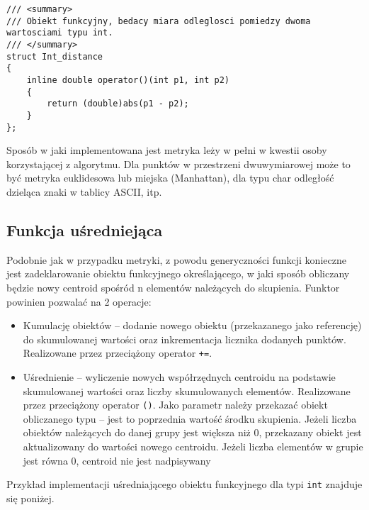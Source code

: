\begin{lstlisting}
/// <summary>
/// Obiekt funkcyjny, bedacy miara odleglosci pomiedzy dwoma wartosciami typu int.
/// </summary>
struct Int_distance
{
	inline double operator()(int p1, int p2)
	{
		return (double)abs(p1 - p2);
	}
};
\end{lstlisting}

Sposób w jaki implementowana jest metryka leży w pełni w kwestii osoby korzystającej z algorytmu. Dla punktów w przestrzeni dwuwymiarowej może to być metryka euklidesowa lub miejska (Manhattan), dla typu char odległość dzieląca znaki w tablicy ASCII, itp.

\subsection{Funkcja uśredniejąca}\label{avg}

Podobnie jak w przypadku metryki, z powodu generyczności funkcji konieczne jest zadeklarowanie obiektu funkcyjnego określającego, w jaki sposób obliczany będzie nowy centroid spośród n elementów należących do skupienia. Funktor powinien pozwalać na 2 operacje:

\begin{itemize}
	\item Kumulację obiektów -- dodanie nowego obiektu (przekazanego jako referencję) do skumulowanej wartości oraz inkrementacja licznika dodanych punktów. Realizowane przez przeciążony operator \texttt{+=}.
	\item Uśrednienie -- wyliczenie nowych współrzędnych centroidu na podstawie skumulowanej wartości oraz liczby skumulowanych elementów. Realizowane przez przeciążony operator \texttt{()}. Jako parametr należy przekazać obiekt obliczanego typu -- jest to poprzednia wartość środku skupienia. Jeżeli liczba obiektów należących do danej grupy jest większa niż 0, przekazany obiekt jest aktualizowany do wartości nowego centroidu. Jeżeli liczba elementów w grupie jest równa 0, centroid nie jest nadpisywany
\end{itemize}

Przykład implementacji uśredniającego obiektu funkcyjnego dla typi \texttt{int} znajduje się poniżej.

